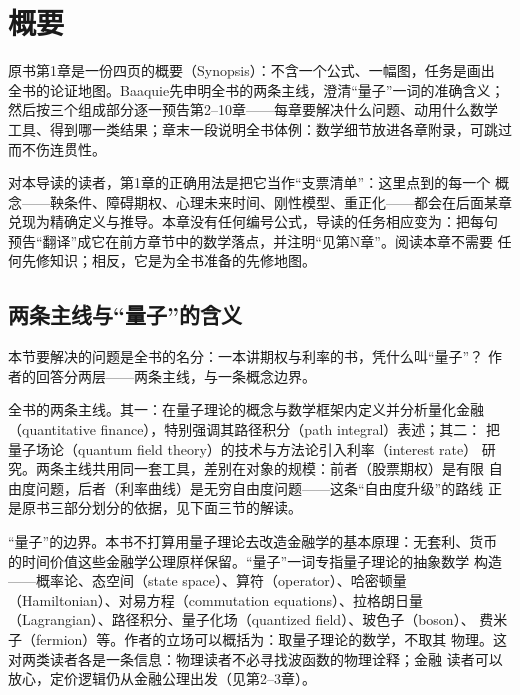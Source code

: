 \chapter{概要}

原书第1章是一份四页的概要（Synopsis）：不含一个公式、一幅图，任务是画出
全书的论证地图。Baaquie先申明全书的两条主线，澄清“量子”一词的准确含义；
然后按三个组成部分逐一预告第2--10章——每章要解决什么问题、动用什么数学
工具、得到哪一类结果；章末一段说明全书体例：数学细节放进各章附录，可跳过
而不伤连贯性。

对本导读的读者，第1章的正确用法是把它当作“支票清单”：这里点到的每一个
概念——鞅条件、障碍期权、心理未来时间、刚性模型、重正化——都会在后面某章
兑现为精确定义与推导。本章没有任何编号公式，导读的任务相应变为：把每句
预告“翻译”成它在前方章节中的数学落点，并注明“见第N章”。阅读本章不需要
任何先修知识；相反，它是为全书准备的先修地图。

\section{两条主线与“量子”的含义}

本节要解决的问题是全书的名分：一本讲期权与利率的书，凭什么叫“量子”？
作者的回答分两层——两条主线，与一条概念边界。

全书的两条主线。其一：在量子理论的概念与数学框架内定义并分析量化金融
（quantitative finance），特别强调其路径积分（path integral）表述；其二：
把量子场论（quantum field theory）的技术与方法论引入利率（interest rate）
研究。两条主线共用同一套工具，差别在对象的规模：前者（股票期权）是有限
自由度问题，后者（利率曲线）是无穷自由度问题——这条“自由度升级”的路线
正是原书三部分划分的依据，见下面三节的解读。

“量子”的边界。本书不打算用量子理论去改造金融学的基本原理：无套利、货币
的时间价值这些金融学公理原样保留。“量子”一词专指量子理论的抽象数学
构造——概率论、态空间（state space）、算符（operator）、哈密顿量
（Hamiltonian）、对易方程（commutation equations）、拉格朗日量
（Lagrangian）、路径积分、量子化场（quantized field）、玻色子（boson）、
费米子（fermion）等。作者的立场可以概括为：取量子理论的数学，不取其
物理。这对两类读者各是一条信息：物理读者不必寻找波函数的物理诠释；金融
读者可以放心，定价逻辑仍从金融公理出发（见第2--3章）。


